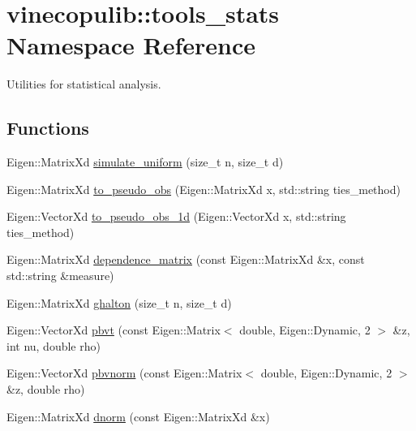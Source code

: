 \hypertarget{namespacevinecopulib_1_1tools__stats}{}\section{vinecopulib\+:\+:tools\+\_\+stats Namespace Reference}
\label{namespacevinecopulib_1_1tools__stats}


Utilities for statistical analysis.  


\subsection*{Functions}
\begin{DoxyCompactItemize}
\item 
Eigen\+::\+Matrix\+Xd \hyperlink{namespacevinecopulib_1_1tools__stats_a78efaf3caf538201cdb881dd2780b242}{simulate\+\_\+uniform} (size\+\_\+t n, size\+\_\+t d)
\item 
Eigen\+::\+Matrix\+Xd \hyperlink{namespacevinecopulib_1_1tools__stats_afda41507cee7cba84602e28e56cfcd99}{to\+\_\+pseudo\+\_\+obs} (Eigen\+::\+Matrix\+Xd x, std\+::string ties\+\_\+method)
\item 
Eigen\+::\+Vector\+Xd \hyperlink{namespacevinecopulib_1_1tools__stats_a9e4849a2a908703a68e92e0c0633237f}{to\+\_\+pseudo\+\_\+obs\+\_\+1d} (Eigen\+::\+Vector\+Xd x, std\+::string ties\+\_\+method)
\item 
Eigen\+::\+Matrix\+Xd \hyperlink{namespacevinecopulib_1_1tools__stats_ae2eca8e0fc4ac2d7eeb0226845214847}{dependence\+\_\+matrix} (const Eigen\+::\+Matrix\+Xd \&x, const std\+::string \&measure)
\item 
Eigen\+::\+Matrix\+Xd \hyperlink{namespacevinecopulib_1_1tools__stats_ae0ba8000d0941c82677df06ce6d1d564}{ghalton} (size\+\_\+t n, size\+\_\+t d)
\item 
Eigen\+::\+Vector\+Xd \hyperlink{namespacevinecopulib_1_1tools__stats_a1e81bac0b4e1e9e0158b800a7db0d1af}{pbvt} (const Eigen\+::\+Matrix$<$ double, Eigen\+::\+Dynamic, 2 $>$ \&z, int nu, double rho)
\item 
Eigen\+::\+Vector\+Xd \hyperlink{namespacevinecopulib_1_1tools__stats_a6867eea2d193c7e5d78b30b9991397ad}{pbvnorm} (const Eigen\+::\+Matrix$<$ double, Eigen\+::\+Dynamic, 2 $>$ \&z, double rho)
\item 
Eigen\+::\+Matrix\+Xd \hyperlink{namespacevinecopulib_1_1tools__stats_a249880b93e82211207869f94821de440}{dnorm} (const Eigen\+::\+Matrix\+Xd \&x)
\item 

\end{DoxyCompactItemize}
